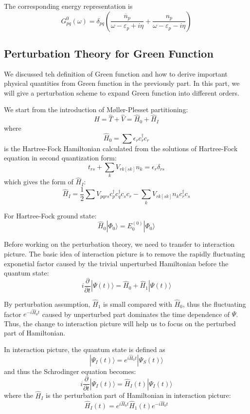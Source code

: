 \documentclass[bachelor, english]{ustcthesis}
\begin{document}
The corresponding energy representation is
$$
G_{p q}^{0}(\omega)=\delta_{p q}\left(\frac{\overline{n}_{p}}{\omega-\varepsilon_{p}+i \eta}+\frac{n_{p}}{\omega-\varepsilon_{p}-i \eta}\right)
$$

\subsection{Perturbation Theory for Green Function}

We discussed teh definition of Green function and how to derive important physical quantities from Green function in the previously part.
In this part, we will give a perturbation scheme to expand Green function into different orders.

We start from the introduction of M{\o}ller-Plesset partitioning:
$$
\hat{H}=\hat{T}+\hat{V}=\hat{H}_{0}+\hat{H}_{I}
$$
where
$$
\hat{H}_{0}=\sum \epsilon_{r} c_{r}^{\dagger} c_{r}
$$
is the Hartree-Fock Hamiltonian calculated from the solutions of Hartree-Fock equation in second quantization form:
$$
t_{r s}+\sum_{k} V_{r k[s k]} n_{k}=\epsilon_{r} \delta_{r s}
$$
which gives the form of $\hat{H}_I$:
$$
\hat{H}_I=\frac{1}{2} \sum V_{p q r s} c_{p}^{\dagger} c_{q}^{\dagger} c_{s} c_{r}-\sum_{k} V_{r k[s k]} n_{k} c_{r}^{\dagger} c_{s}
$$

For Hartree-Fock ground state:
$$
\hat{H}_{0} | \Phi_{0} \rangle=E_{0}^{(0)} | \Phi_{0} \rangle
$$

Before working on the perturbation theory, we need to transfer to interaction picture.
The basic idea of interaction picture is to remove the rapidly fluctuating exponetial factor caused by the trivial unperturbed Hamiltonian before the quantum state:
$$
i \frac{\partial}{\partial t} | \Psi(t) \rangle=\hat{H}_{0}+\hat{H}_{1} | \Psi(t) \rangle
$$

By perturbation assumption, $\hat{H}_1$ is small compared with $\hat{H}_0$, thus the fluctuating factor $e^{-i \hat{H}_0 t}$ caused by unperturbed part dominates the time dependence of $\Psi$.
Thus, the change to interaction picture will help us to focus on the perturbed part of Hamiltonian.

In interaction picture, the quantum state is defined as
$$
| \Psi_{I}(t) \rangle=e^{i \hat{H}_{0} t} | \Psi_{S}(t) \rangle
$$
and thus the Schrodinger equation becomes:
$$
i \frac{\partial}{\partial t} | \Psi_{I}(t) \rangle=\hat{H}_{I}(t) | \Psi_{I}(t) \rangle
$$
where the $\hat{H}_I$ is the perturbation part of Hamiltonian in interaction picture:
$$
\hat{H}_{I}(t)=e^{i \hat{H}_{0} t} \hat{H}_{1}(t) e^{-i \hat{H}_{0} t}
$$
\end{document}
